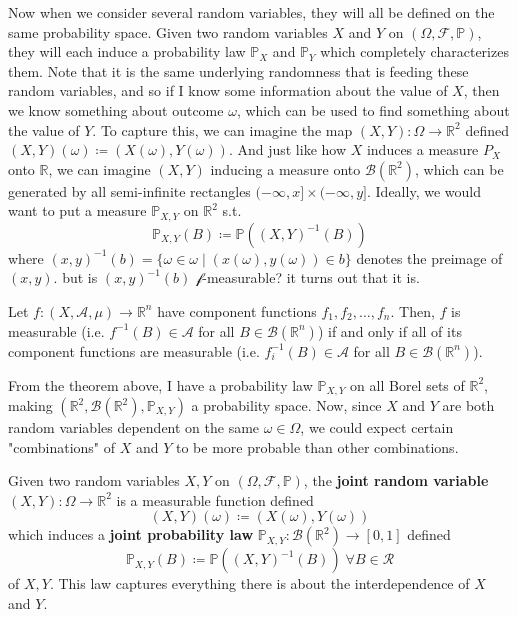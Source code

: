   Now when we consider several random variables, they will all be defined on the same probability space. Given two random variables $X$ and $Y$ on $(\Omega, \mathcal{F}, \mathbb{P})$, they will each induce a probability law $\mathbb{P}_X$ and $\mathbb{P}_Y$ which completely characterizes them. Note that it is the same underlying randomness that is feeding these random variables, and so if I know some information about the value of $X$, then we know something about outcome $\omega$, which can be used to find something about the value of $Y$. To capture this, we can imagine the map $(X, Y) : \Omega \longrightarrow \mathbb{R}^2$ defined $(X, Y)(\omega) \coloneqq (X(\omega), Y(\omega))$. And just like how $X$ induces a measure $P_X$ onto $\mathbb{R}$, we can imagine $(X, Y)$ inducing a measure onto $\mathcal{B}(\mathbb{R}^2)$, which can be generated by all semi-infinite rectangles $(-\infty, x] \times (-\infty, y]$. Ideally, we would want to put a measure $\mathbb{P}_{X, Y}$ on $\mathbb{R}^2$ s.t. 
  \begin{equation}
    \mathbb{P}_{X, Y}(B) \coloneqq \mathbb{P}((X, Y)^{-1}(B))
  \end{equation}
  where $(x, y)^{-1}(b) = \{ \omega \in \omega \mid (x(\omega), y(\omega)) \in b\}$ denotes the preimage of $(x, y)$. but is $(x, y)^{-1}(b)$ $\mathcal{f}$-measurable? it turns out that it is. 

  \begin{theorem}
    Let $f: (X, \mathcal{A}, \mu) \longrightarrow \mathbb{R}^n$ have component functions $f_1, f_2, \ldots, f_n$. Then, $f$ is measurable (i.e. $f^{-1} (B) \in \mathcal{A}$ for all $B \in \mathcal{B}(\mathbb{R}^n)$) if and only if all of its component functions are measurable (i.e. $f_i^{-1} (B) \in \mathcal{A}$ for all $B \in \mathcal{B}(\mathbb{R}^n)$). 
  \end{theorem}

  From the theorem above, I have a probability law $\mathbb{P}_{X, Y}$ on all Borel sets of $\mathbb{R}^2$, making $(\mathbb{R}^2, \mathcal{B}(\mathbb{R}^2), \mathbb{P}_{X, Y})$ a probability space. Now, since $X$ and $Y$ are both random variables dependent on the same $\omega \in \Omega$, we could expect certain "combinations" of $X$ and $Y$ to be more probable than other combinations. 

  \begin{definition}
    Given two random variables $X, Y$ on $(\Omega, \mathcal{F}, \mathbb{P})$, the \textbf{joint random variable} $(X, Y): \Omega \longrightarrow \mathbb{R}^2$ is a measurable function defined 
    \begin{equation}
      (X, Y) (\omega) \coloneqq (X(\omega), Y(\omega))
    \end{equation}
    which induces a \textbf{joint probability law} $\mathbb{P}_{X, Y}: \mathcal{B}(\mathbb{R}^2) \longrightarrow [0, 1]$ defined 
    \begin{equation}
      \mathbb{P}_{X, Y}(B) \coloneqq \mathbb{P}((X, Y)^{-1}(B)) \; \forall B \in \mathcal{R}
    \end{equation}
    of $X, Y$. This law captures everything there is about the interdependence of $X$ and $Y$. 
  \end{definition}


